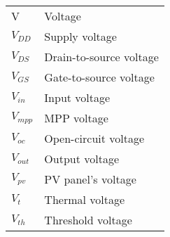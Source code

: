 \begin{tabular}{ll}
V & Voltage\\
$V_{DD}$ & Supply voltage\\
$V_{DS}$ & Drain-to-source voltage\\
$V_{GS}$ & Gate-to-source voltage\\
$V_{in}$ & Input voltage \\
$V_{mpp}$ & MPP voltage\\
$V_{oc}$ & Open-circuit voltage\\
$V_{out}$ & Output voltage \\
$V_{pv}$ & PV panel's voltage \\
$V_{t}$ & Thermal voltage \\
$V_{th}$ & Threshold voltage \\

\end{tabular}